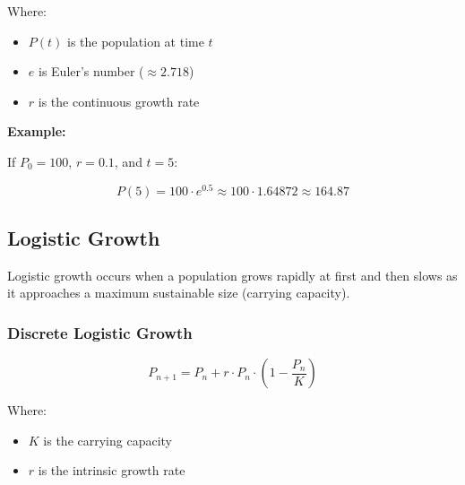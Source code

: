 Where:

\begin{itemize}

  \item \(P(t)\) is the population at time \(t\)

  \item \(e\) is Euler’s number (\(\approx 2.718\))

  \item \(r\) is the continuous growth rate

\end{itemize}

\textbf{Example:}
\vspace{\baselineskip}
  
If \(P_0 = 100\), \(r = 0.1\), and \(t = 5\):

\[
    P(5) = 100 \cdot e^{0.5} \approx 100 \cdot 1.64872 \approx 164.87
\]

\begin{center}
\end{center}

\subsection{Logistic Growth}

Logistic growth occurs when a population grows rapidly at first and then slows as it approaches a maximum sustainable size (carrying capacity).

\subsubsection{Discrete Logistic Growth}

\[
    P_{n+1} = P_n + r \cdot P_n \cdot \left(1 - \frac{P_n}{K}\right)
\]

Where:

\begin{itemize}

  \item \(K\) is the carrying capacity

  \item \(r\) is the intrinsic growth rate

\end{itemize}


